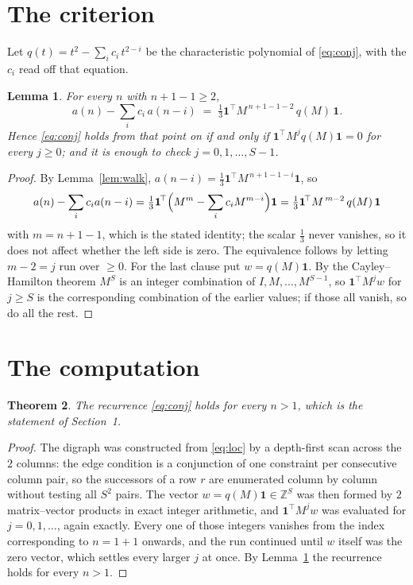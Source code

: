 \documentclass[11pt,a4paper]{article}
\theoremstyle{plain}
\newtheorem{theorem}{Theorem}
\newtheorem{lemma}[theorem]{Lemma}
\theoremstyle{definition}
\begin{document}
\section{The criterion}

Let $q(t)=t^{2}-\sum_i c_i\,t^{2-i}$ be the characteristic polynomial of
\eqref{eq:conj}, with the $c_i$ read off that equation.

\begin{lemma}\label{lem:crit}
For every $n$ with $n+1-1\ge2$,
\[
a(n)-\sum_i c_i\,a(n-i)\;=\;\tfrac1{3}\mathbf{1}^{\!\top}M^{\,n+1-1-2}\,q(M)\,\mathbf{1} .
\]
Hence \eqref{eq:conj} holds from that point on if and only if
$\mathbf{1}^{\!\top}M^{j}q(M)\mathbf{1}=0$ for every $j\ge0$; and it is enough to check
$j=0,1,\dots,S-1$.
\end{lemma}

\begin{proof}
By Lemma~\ref{lem:walk}, $a(n-i)=\tfrac1{3}\mathbf{1}^{\!\top}M^{\,n+1-1-i}\mathbf{1}$, so
\[
a(n)-\sum_i c_i a(n-i)
=\tfrac1{3}\mathbf{1}^{\!\top}\Bigl(M^{m}-\sum_i c_i M^{m-i}\Bigr)\mathbf{1}
=\tfrac1{3}\mathbf{1}^{\!\top}M^{\,m-2}\,q(M)\,\mathbf{1}
\]
with $m=n+1-1$, which is the stated identity; the scalar $\tfrac1{3}$ never vanishes, so
it does not affect whether the left side is zero. The equivalence follows by letting
$m-2=j$ run over $\ge0$. For the last clause put $w=q(M)\mathbf{1}$. By the
Cayley--Hamilton theorem $M^{S}$ is an integer combination of $I,M,\dots,M^{S-1}$, so
$\mathbf{1}^{\!\top}M^{j}w$ for $j\ge S$ is the corresponding combination of the earlier
values; if those all vanish, so do all the rest.
\end{proof}

\section{The computation}

\begin{theorem}
The recurrence \eqref{eq:conj} holds for every $n>1$, which is the statement of
Section~1.
\end{theorem}

\begin{proof}
The digraph was constructed from \eqref{eq:loc} by a depth-first scan across the $2$
columns: the edge condition is a conjunction of one constraint per consecutive column
pair, so the successors of a row $r$ are enumerated column by column without testing all
$S^2$ pairs. The vector $w=q(M)\mathbf{1}\in\mathbb{Z}^{S}$ was then formed by $2$
matrix--vector products in exact integer arithmetic, and $\mathbf{1}^{\!\top}M^{j}w$ was
evaluated for $j=0,1,\dots$, again exactly. Every one of those integers vanishes from the
index corresponding to $n=1+1$ onwards, and the run continued until $w$ itself was the
zero vector, which settles every larger $j$ at once. By Lemma~\ref{lem:crit} the recurrence
holds for every $n>1$.
\end{proof}
\end{document}
